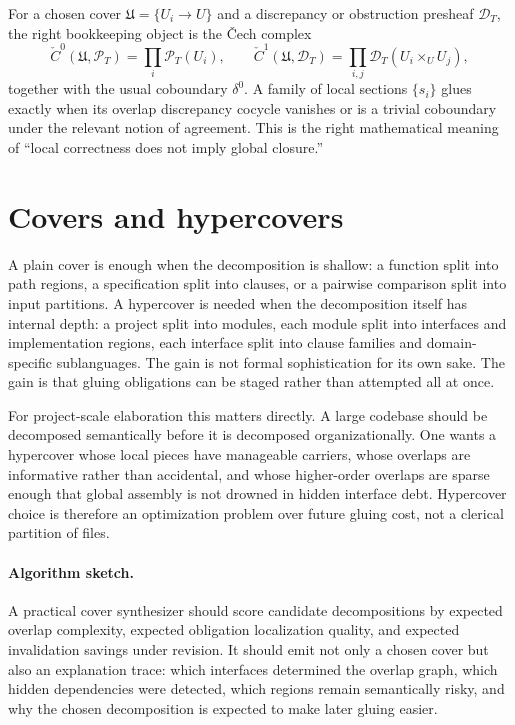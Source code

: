 \documentclass[11pt]{report}
\begin{document}
For a chosen cover $\mathfrak{U}=\{U_i\to U\}$ and a discrepancy or obstruction presheaf $\mathscr{D}_T$, the right bookkeeping object is the \v{C}ech complex
\[
\check{C}^0(\mathfrak{U},\mathscr{P}_T)=\prod_i \mathscr{P}_T(U_i), \qquad
\check{C}^1(\mathfrak{U},\mathscr{D}_T)=\prod_{i,j}\mathscr{D}_T(U_i\times_U U_j),
\]
together with the usual coboundary $\delta^0$. A family of local sections $\{s_i\}$ glues exactly when its overlap discrepancy cocycle vanishes or is a trivial coboundary under the relevant notion of agreement. This is the right mathematical meaning of ``local correctness does not imply global closure.''
\section{Covers and hypercovers}
A plain cover is enough when the decomposition is shallow: a function split into path regions, a specification split into clauses, or a pairwise comparison split into input partitions. A hypercover is needed when the decomposition itself has internal depth: a project split into modules, each module split into interfaces and implementation regions, each interface split into clause families and domain-specific sublanguages. The gain is not formal sophistication for its own sake. The gain is that gluing obligations can be staged rather than attempted all at once.

For project-scale elaboration this matters directly. A large codebase should be decomposed semantically before it is decomposed organizationally. One wants a hypercover whose local pieces have manageable carriers, whose overlaps are informative rather than accidental, and whose higher-order overlaps are sparse enough that global assembly is not drowned in hidden interface debt. Hypercover choice is therefore an optimization problem over future gluing cost, not a clerical partition of files.

\paragraph{Algorithm sketch.}
A practical cover synthesizer should score candidate decompositions by expected overlap complexity, expected obligation localization quality, and expected invalidation savings under revision. It should emit not only a chosen cover but also an explanation trace: which interfaces determined the overlap graph, which hidden dependencies were detected, which regions remain semantically risky, and why the chosen decomposition is expected to make later gluing easier.
\end{document}
